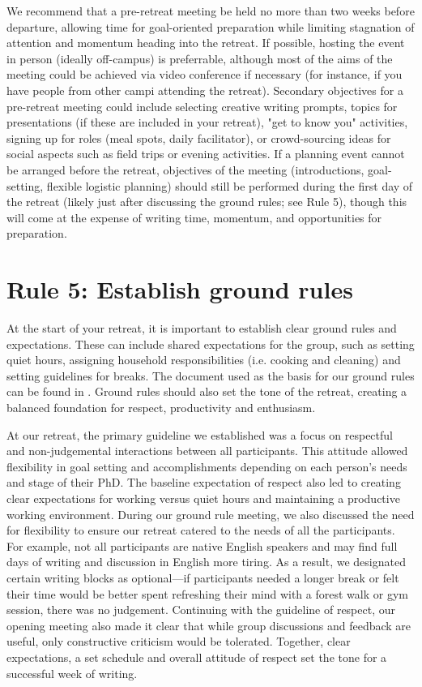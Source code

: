 \documentclass[10pt,letterpaper]{article}
\begin{document}
We recommend that a pre-retreat meeting be held no more than two weeks before departure, allowing time for goal-oriented preparation while limiting stagnation of attention and momentum heading into the retreat. If possible, hosting the event in person (ideally off-campus) is preferrable, although most of the aims of the meeting could be achieved via video conference if necessary (for instance, if you have people from other campi attending the retreat). Secondary objectives for a pre-retreat meeting could include selecting creative writing prompts, topics for presentations (if these are included in your retreat), "get to know you" activities, signing up for roles (meal spots, daily facilitator), or crowd-sourcing ideas for social aspects such as field trips or evening activities. If a planning event cannot be arranged before the retreat, objectives of the meeting (introductions, goal-setting, flexible logistic planning) should still be performed during the first day of the retreat (likely just after discussing the ground rules; see Rule 5), though this will come at the expense of writing time, momentum, and opportunities for preparation.

\section*{Rule 5: Establish ground rules}

At the start of your retreat, it is important to establish clear ground rules and expectations. These can include shared expectations for the group, such as setting quiet hours, assigning household responsibilities (i.e. cooking and cleaning) and setting guidelines for breaks. The document used as the basis for our ground rules can be found in . Ground rules should also set the tone of the retreat, creating a balanced foundation for respect, productivity and enthusiasm.

At our retreat, the primary guideline we established was a focus on respectful and non-judgemental interactions between all participants. This attitude allowed flexibility in goal setting and accomplishments depending on each person's needs and stage of their PhD. The baseline expectation of respect also led to creating clear expectations for working versus quiet hours and maintaining a productive working environment. During our ground rule meeting, we also discussed the need for flexibility to ensure our retreat catered to the needs of all the participants. For example, not all participants are native English speakers and may find full days of writing and discussion in English more tiring. As a result, we designated certain writing blocks as optional---if participants needed a longer break or felt their time would be better spent refreshing their mind with a forest walk or gym session, there was no judgement. Continuing with the guideline of respect, our opening meeting also made it clear that while group discussions and feedback are useful, only constructive criticism would be tolerated. Together, clear expectations, a set schedule and overall attitude of respect set the tone for a successful week of writing.
\end{document}
